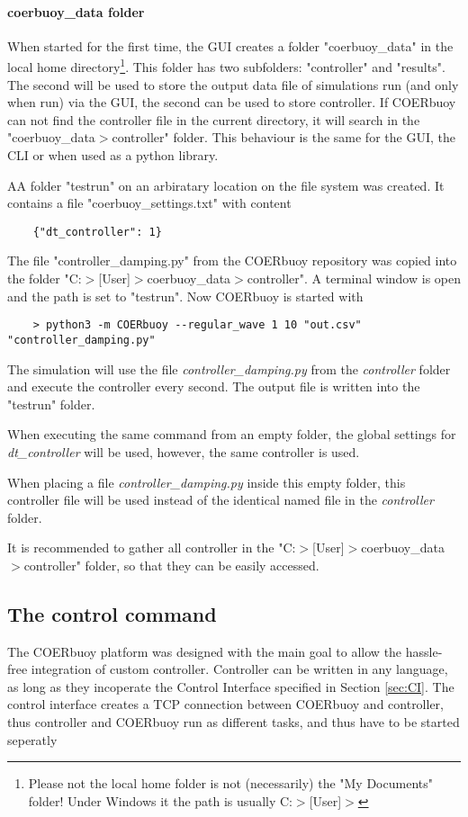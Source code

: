 \documentclass[oneside,10pt,a4paper]{book}
\begin{document}
\paragraph{coerbuoy\_data folder}
When started for the first time, the GUI creates a folder "coerbuoy\_data" in the local home directory\footnote{Please not the local home folder is not (necessarily) the "My Documents" folder! Under Windows it the path is usually C:$>$[User]$>$}. This folder has two subfolders: "controller" and "results". The second will be used to store the output data file of simulations run (and only when run) via the GUI, the second can be used to store controller. If COERbuoy can not find the controller file in the current directory, it will search in the "coerbuoy\_data$>$controller" folder. This behaviour is the same for the GUI, the CLI or when used as a python library.
\begin{example}
AA folder "testrun" on an arbiratary location on the file system was created. It contains a file "coerbuoy\_settings.txt" with content
\begin{verbatim}
	{"dt_controller": 1}
\end{verbatim}
The file "controller\_damping.py" from the COERbuoy repository was copied into the folder "C:$>$[User]$>$coerbuoy\_data$>$controller". A terminal window is open and the path is set to "testrun". Now COERbuoy is started with
\begin{verbatim}
	> python3 -m COERbuoy --regular_wave 1 10 "out.csv" "controller_damping.py"
\end{verbatim}
The simulation will use the file \textit{controller\_damping.py} from the \textit{controller} folder and execute the controller every second. The output file is written into the "testrun" folder.

When executing the same command from an empty folder, the global settings for \textit{dt\_controller} will be used, however, the same controller is used.

When placing a file \textit{controller\_damping.py} inside this empty folder, this controller file will be used instead of the identical named file in the \textit{controller} folder.
\end{example}
It is recommended to gather all controller in the "C:$>$[User]$>$coerbuoy\_data$>$controller" folder, so that they can be easily accessed.
\subsection{The control command}
The COERbuoy platform was designed with the main goal to allow the hassle-free integration of custom controller. Controller can be written in any language, as long as they incoperate the Control Interface specified in Section \ref{sec:CI}. The control interface creates a TCP connection between COERbuoy and controller, thus controller and COERbuoy run as different tasks, and thus have to be started seperatly
\end{document}
